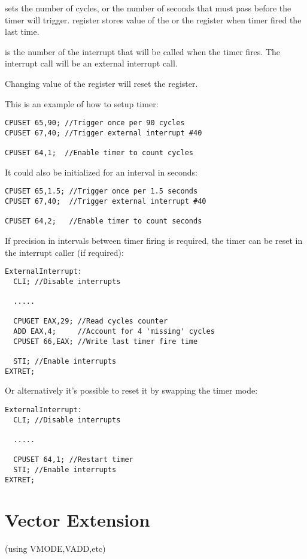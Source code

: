  sets the number of cycles, or the number of seconds that must pass before the timer will trigger.  register stores value of the  or the  register when timer fired the last time.

 is the number of the interrupt that will be called when the timer fires. The interrupt call will be an external interrupt call.

Changing value of the  register will reset the  register.

This is an example of how to setup timer:
\begin{verbatim}
CPUSET 65,90; //Trigger once per 90 cycles
CPUSET 67,40; //Trigger external interrupt #40

CPUSET 64,1;  //Enable timer to count cycles
\end{verbatim}

It could also be initialized for an interval in seconds:
\begin{verbatim}
CPUSET 65,1.5; //Trigger once per 1.5 seconds
CPUSET 67,40;  //Trigger external interrupt #40

CPUSET 64,2;   //Enable timer to count seconds
\end{verbatim}

If precision in intervals between timer firing is required, the timer can be reset in the interrupt caller (if required):
\begin{verbatim}
ExternalInterrupt:
  CLI; //Disable interrupts
  
  .....
  
  CPUGET EAX,29; //Read cycles counter
  ADD EAX,4;     //Account for 4 'missing' cycles
  CPUSET 66,EAX; //Write last timer fire time
  
  STI; //Enable interrupts
EXTRET;
\end{verbatim}

Or alternatively it's possible to reset it by swapping the timer mode:
\begin{verbatim}
ExternalInterrupt:
  CLI; //Disable interrupts
  
  .....
  
  CPUSET 64,1; //Restart timer   
  STI; //Enable interrupts
EXTRET;
\end{verbatim}

\section{Vector Extension}
(using VMODE,VADD,etc)

